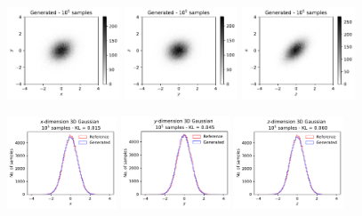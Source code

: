 \documentclass[twocolumn,preprintnumbers,superscriptaddress]{revtex4-2}
\begin{document}
\begin{figure}
  \includegraphics[width=0.3\textwidth]{plots/3Dgaussian_posdef/1-2_FAKE_100k.pdf}%
  \includegraphics[width=0.3\textwidth]{plots/3Dgaussian_posdef/2-3_FAKE_100k.pdf}%
  \includegraphics[width=0.3\textwidth]{plots/3Dgaussian_posdef/3-1_FAKE_100k.pdf}

 
  \includegraphics[width=0.29\textwidth]{plots/3Dgaussian_posdef/1-distribution_3dgaussian_100k.pdf}%
  \includegraphics[width=0.29\textwidth]{plots/3Dgaussian_posdef/2-distribution_3dgaussian_100k.pdf}%
  \includegraphics[width=0.29\textwidth]{plots/3Dgaussian_posdef/3-distribution_3dgaussian_100k.pdf}
  

\end{figure}
\end{document}
